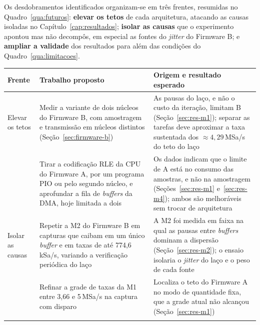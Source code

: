 Os desdobramentos identificados organizam-se em três frentes, resumidas no
Quadro~\ref{qua:futuros}: \textbf{elevar os tetos} de cada arquitetura,
atacando as causas isoladas no Capítulo~\ref{cap:resultados}; \textbf{isolar as
  causas} que o experimento apontou mas não decompôs, em especial as fontes do
\emph{jitter} do Firmware B; e \textbf{ampliar a validade} dos resultados para
além das condições do Quadro~\ref{qua:limitacoes}.

\begin{quadro}[H]
  \centering
  \caption{Trabalhos futuros.}
  \label{qua:futuros}
  \small
  \begin{tabularx}{\linewidth}{|>{\raggedright\arraybackslash}p{2.1cm}|>{\raggedright\arraybackslash}X|>{\raggedright\arraybackslash}X|}
    \hline
    \textbf{Frente} & \textbf{Trabalho proposto}                                                                                                                                                       & \textbf{Origem e resultado esperado} \\ \hline
    Elevar os tetos
                    & Medir a variante de dois núcleos do Firmware B, com amostragem e transmissão em núcleos distintos (Seção~\ref{sec:firmware-b})
                    & As pausas do laço, e não o custo da iteração, limitam B (Seção~\ref{sec:res-m1}); separar as tarefas deve aproximar a taxa sustentada dos $\approx 4{,}29$\,MSa/s do teto do laço                                        \\ \cline{2-3}
                    & Tirar a codificação \ac{RLE} da \ac{CPU} do Firmware A, por um programa \ac{PIO} ou pelo segundo núcleo, e aprofundar a fila de \emph{buffers} da \ac{DMA}, hoje limitada a dois
                    & Os dados indicam que o limite de A está no consumo das amostras, e não na amostragem (Seções~\ref{sec:res-m1} e~\ref{sec:res-m4}); ambos são melhoráveis sem trocar de arquitetura \\ \hline
    Isolar as causas
                    & Repetir a M2 do Firmware B em capturas que caibam em um único \emph{buffer} e em taxas de até 774,6\,kSa/s, variando a verificação periódica do laço
                    & A M2 foi medida em faixa na qual as pausas entre \emph{buffers} dominam a dispersão (Seção~\ref{sec:res-m2}); o ensaio isolaria o \emph{jitter} do laço e o peso de cada fonte \\ \cline{2-3}
                    & Refinar a grade de taxas da M1 entre 3,66 e 5\,MSa/s na captura com disparo
                    & Localiza o teto do Firmware A no modo de quantidade fixa, que a grade atual não alcançou (Seção~\ref{sec:res-m1}) \\ \cline{2-3}

\end{tabularx}
\end{quadro}
